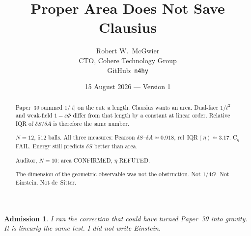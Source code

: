 \documentclass[11pt]{article}
\title{\textbf{Proper Area Does Not Save Clausius}}
\author{Robert W.\ McGwier\\
\small CTO, Cohere Technology Group\\
\small GitHub: \texttt{n4hy}}
\date{15 August 2026 --- Version 1}
\newtheorem*{admission}{Admission}
\begin{document}
\maketitle

\begin{abstract}
\noindent
Paper~39 summed $1/\lvert t\rvert$ on the cut: a length.
Clausius wants an area. Dual-face $1/t^2$ and weak-field
$1-\varepsilon\Phi$ differ from that length by a constant
at linear order. Relative IQR of $\delta S/\delta A$ is
therefore the same number.

$N=12$, $512$ balls. All three measures:
Pearson $\delta S$--$\delta A\simeq 0.918$,
rel~IQR$(\eta)\simeq 3.17$. C$_\eta$ FAIL.
Energy still predicts $\delta S$ better than area.

Auditor, $N=10$: area CONFIRMED, $\eta$ REFUTED.

The dimension of the geometric observable was not the
obstruction. Not $1/4G$. Not Einstein. Not de~Sitter.
\end{abstract}

\begin{admission}
I ran the correction that could have turned Paper~39 into
gravity. It is linearly the same test. I did not write
Einstein.
\end{admission}
\end{document}

